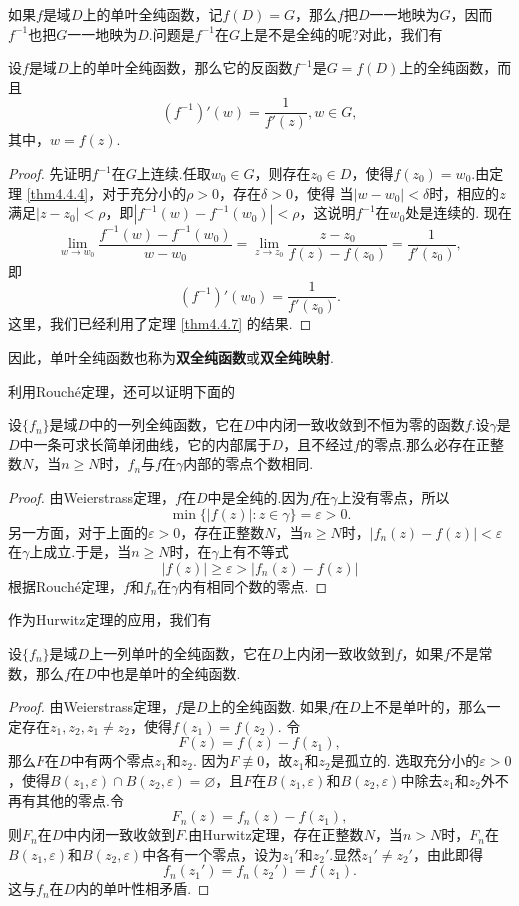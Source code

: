 如果$f$是域$D$上的单叶全纯函数，记$f(D)=G$，那么$f$把$D$一一地映为$G$，因而$f^{-1}$也把$G$一一地映为$D$.问题是$f^{-1}$在$G$上是不是全纯的呢?对此，我们有
\begin{theorem}\label{thm4.4.9}
  设$f$是域$D$上的单叶全纯函数，那么它的反函数$f^{-1}$是$G=f(D)$上的全纯函数，而且
  \[
    (f^{-1})'(w) = \frac1{f'(z)},w\in G,
  \]
  其中，$w=f(z)$.
\end{theorem}
\begin{proof}
  先证明$f^{-1}$在$G$上连续.任取$w_0\in G$，则存在$z_0\in D$，使得$f(z_0)=w_0$.由定理 \ref{thm4.4.4}，对于充分小的$\rho>0$，存在$\delta>0$，使得
  当$|w-w_0|<\delta$时，相应的$z$满足$|z-z_0|<\rho$，即$|f^{-1}(w)-f^{-1}(w_0)|<\rho$，这说明$f^{-1}$在$w_0$处是连续的. 现在
  \[
    \lim_{w\to w_0}\frac{f^{-1}(w)-f^{-1}(w_0)}{w-w_0}=\lim_{z\to z_0}\frac{z-z_0}{f(z)-f(z_0)}=\frac1{f'(z_0)},
  \]
  即
  \[
    (f^{-1})'(w_0) = \frac1{f'(z_0)}.
  \]
  这里，我们已经利用了定理 \ref{thm4.4.7} 的结果.
\end{proof}

因此，单叶全纯函数也称为\textbf{双全纯函数}或\textbf{双全纯映射}.

利用Rouch\'e定理，还可以证明下面的
\begin{theorem}\label{thm4.4.10}
  设$\{f_n\}$是域$D$中的一列全纯函数，它在$D$中内闭一致收敛到不恒为零的函数$f$.设$\gamma$是$D$中一条可求长简单闭曲线，它的内部属于$D$，且不经过$f$的零点.那么必存在正整数$N$，当$n\ge N$时，$f_n$与$f$在$\gamma$内部的零点个数相同.
\end{theorem}
\begin{proof}
  由Weierstrass定理，$f$在$D$中是全纯的.因为$f$在$\gamma$上没有零点，所以
  \[
    \min\{|f(z)|:z\in \gamma\} = \varepsilon>0.
  \]
  另一方面，对于上面的$\varepsilon>0$，存在正整数$N$，当$n\ge N$时，$|f_n(z)-f(z)|<\varepsilon
  $在$\gamma$上成立.于是，当$n\ge N$时，在$\gamma$上有不等式
  \[
    |f(z)| \ge \varepsilon > |f_n(z) - f(z)|
  \]
  根据Rouch\'e定理，$f$和$f_n$在$\gamma$内有相同个数的零点.
\end{proof}

作为Hurwitz定理的应用，我们有
\begin{theorem}\label{thm4.4.11}
  设$\{f_n\}$是域$D$上一列单叶的全纯函数，它在$D$上内闭一致收敛到$f$，如果$f$不是常数，那么$f$在$D$中也是单叶的全纯函数.
\end{theorem}
\begin{proof}
  由Weierstrass定理，$f$是$D$上的全纯函数. 如果$f$在$D$上不是单叶的，那么一定存在$z_1,z_2,z_1\ne z_2$，使得$f(z_1)=f(z_2)$. 令
  \[
    F(z) = f(z) - f(z_1),
  \]
  那么$F$在$D$中有两个零点$z_1$和$z_2$. 因为$F\not\equiv 0$，故$z_1$和$z_2$是孤立的. 选取充分小的$\varepsilon>0$，使得$B(z_1,\varepsilon)\cap B(z_2,\varepsilon)=\varnothing$，且$F$在$B(z_1,\varepsilon)$和$B(z_2,\varepsilon)$中除去$z_1$和$z_2$外不再有其他的零点.令
  \[
    F_n(z) = f_n(z) - f(z_1),
  \]
  则$F_n$在$D$中内闭一致收敛到$F$.由Hurwitz定理，存在正整数$N$，当$n>N$时，$F_n$在$B(z_1,\varepsilon)$和$ B(z_2,\varepsilon)$中各有一个零点，设为$z_1'$和$z_2'$.显然$z_1'\ne z_2' $，由此即得
  \[
    f_n(z_1') = f_n(z_2') = f(z_1).
  \]
  这与$f_n$在$D$内的单叶性相矛盾.
\end{proof}

